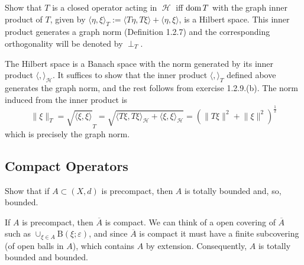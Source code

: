 \documentclass{article}
\theoremstyle{exercisestyle}
\newenvironment{exercise}[1]
  {\renewcommand\theinnerex{#1}\innerex}
  {\endinnerex}
\newcommand{\norm}[1]{\lVert #1 \rVert}
\newcommand{\closure}[1]{\overline{ #1}}
\newcommand{\inner}[2]{\langle #1, #2 \rangle}
\newcommand{\openball}[2]{\text{B}\left(#1;#2\right)}
\DeclareMathOperator{\hilbert}{\mathcal{H}}
\begin{document}
\begin{exercise}{1.2.28}
    Show that $T$ is a closed operator acting in $\hilbert$ iff $\operatorname{dom} T$ with the graph inner product of $T$, given by
    $\inner{\eta}{\xi}_T := \inner{T\eta}{T\xi} + \inner{\eta}{\xi}$, is a Hilbert space.
    This inner product generates a graph norm (Definition 1.2.7) and the corresponding orthogonality will be denoted by $\perp_T$.

    The Hilbert space is a Banach space with the norm generated by its inner product $\langle , \rangle_{\hilbert}$.
    It suffices to show that the inner product $\langle , \rangle_T$ defined above generates the graph norm, and the rest follows from exercise 1.2.9.(b).
    The norm induced from the inner product is
    $$\norm{\xi}_T = \sqrt{\inner{\xi}{\xi}}_T = \sqrt{\inner{T\xi}{T\xi}_{\hilbert} + \inner{\xi}{\xi}_{\hilbert}}= \left(\norm{T\xi}^2 + \norm{\xi}^2\right)^{\frac{1}{2}}$$
    which is precisely the graph norm.

\end{exercise}

\subsection{Compact Operators}

\begin{exercise}{1.3.1}
    Show that if $A \subset (X, d)$ is precompact, then $A$ is totally bounded and, so, bounded.

    If $A$ is precompact, then $\closure{A}$ is compact. We can think of a open covering of $\closure{A}$ such as $\cup_{\xi \in A} \openball{\xi}{\varepsilon}$,
    and since $\closure{A}$ is compact it must have a finite subcovering (of open balls in $A$), which contains $A$ by extension. Consequently, $A$ is totally bounded and bounded.

\end{exercise}
\end{document}
